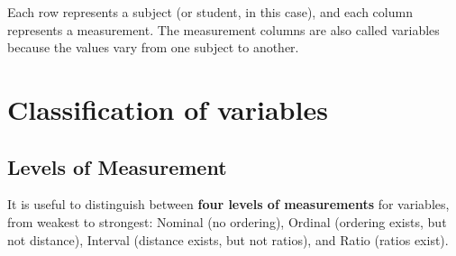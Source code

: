\documentclass[11pt]{book}\usepackage[]{graphicx}\usepackage[]{color}
\begin{document}
Each row represents a subject (or student, in this case), and each column represents a measurement.  The measurement columns are also called variables because the values vary from one subject to another.

\section{Classification of variables}

\subsection{Levels of Measurement}

It is useful to distinguish between \textbf{four levels of measurements} for variables, from weakest to strongest: Nominal (no ordering), Ordinal (ordering exists, but not distance), Interval (distance exists, but not ratios), and Ratio (ratios exist).
\end{document}
